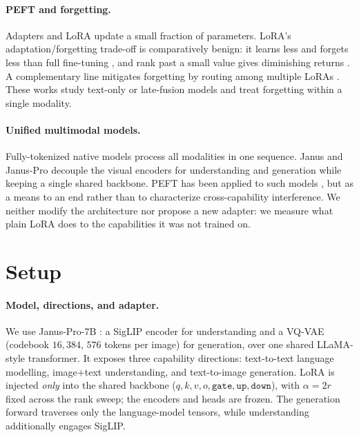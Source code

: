 \documentclass{article}
\begin{document}
\paragraph{PEFT and forgetting.}
Adapters \citep{houlsby2019parameter} and LoRA \citep{hu2022lora} update a small
fraction of parameters. LoRA's adaptation/forgetting trade-off is comparatively
benign: it learns less and forgets less than full fine-tuning
\citep{biderman2024lora}, and rank past a small value gives diminishing returns
\citep{zhang2024scalingmeetsfinetuning}. A complementary line mitigates
forgetting by routing among multiple LoRAs \citep{dou2024loramoe, wu2024mole,
li2024mixlora}. These works study text-only or late-fusion models and treat
forgetting within a single modality.

\paragraph{Unified multimodal models.}
Fully-tokenized native models \citep{chameleon2024, bachmann20244m21,
lu2024unifiedio2} process all modalities in one sequence. Janus and Janus-Pro
\citep{wu2024janus, januspro} decouple the visual encoders for understanding and
generation while keeping a single shared backbone. PEFT has been applied to such
models \citep{chern2024anole, serra2024narrowgate, wang2025vora}, but as a means
to an end rather than to characterize cross-capability interference. We neither
modify the architecture nor propose a new adapter: we measure what plain LoRA
does to the capabilities it was not trained on.

\section{Setup}
\paragraph{Model, directions, and adapter.}
We use Janus-Pro-7B \citep{januspro}: a SigLIP encoder for understanding and a
VQ-VAE (codebook $16{,}384$, $576$ tokens per image) for generation, over one
shared LLaMA-style transformer. It exposes three capability directions:
text-to-text language modelling, image$+$text understanding, and text-to-image
generation. LoRA is injected \emph{only} into the shared backbone
($q,k,v,o,\texttt{gate},\texttt{up},\texttt{down}$), with $\alpha=2r$ fixed
across the rank sweep; the encoders and heads are frozen. The generation forward
traverses only the language-model tensors, while understanding additionally
engages SigLIP.
\end{document}
